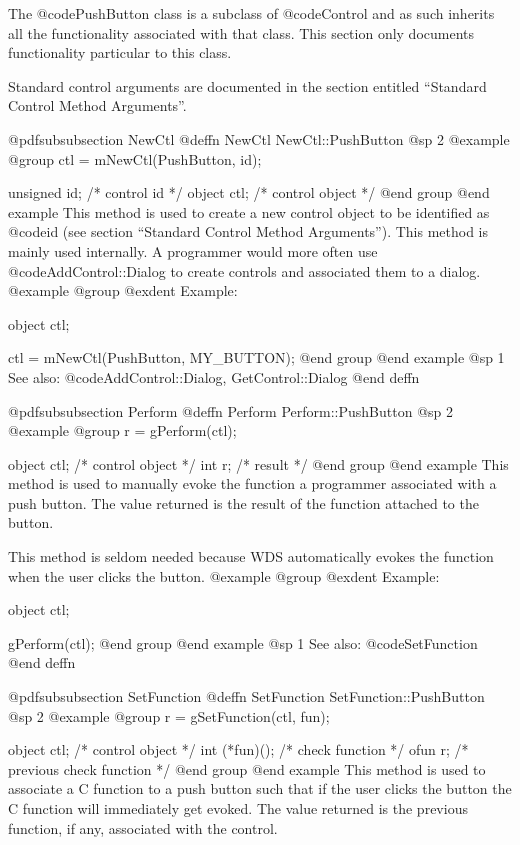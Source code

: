 The @code{PushButton} class is a subclass of @code{Control} and as such
inherits all the functionality associated with that class.  This section
only documents functionality particular to this class.

Standard control arguments are documented in the section entitled
``Standard Control Method Arguments''.





@pdfsubsubsection {NewCtl}
@deffn {NewCtl} NewCtl::PushButton
@sp 2
@example
@group
ctl = mNewCtl(PushButton, id);

unsigned  id;   /*  control id      */
object   ctl;   /*  control object  */
@end group
@end example
This method is used to create a new control object to be identified as
@code{id} (see section ``Standard Control Method Arguments'').  This
method is mainly used internally.  A programmer would more often
use @code{AddControl::Dialog} to create controls and associated them
to a dialog.
@example
@group
@exdent Example:

object  ctl;

ctl = mNewCtl(PushButton, MY_BUTTON);
@end group
@end example
@sp 1
See also:  @code{AddControl::Dialog, GetControl::Dialog}
@end deffn









@pdfsubsubsection {Perform}
@deffn {Perform} Perform::PushButton
@sp 2
@example
@group
r = gPerform(ctl);

object  ctl;      /*  control object  */
int     r;        /*  result          */
@end group
@end example
This method is used to manually evoke the function a programmer associated 
with a push button.  The value returned is the result of the function
attached to the button.

This method is seldom needed because WDS automatically evokes the function
when the user clicks the button.
@example
@group
@exdent Example:

object  ctl;

gPerform(ctl);
@end group
@end example
@sp 1
See also:  @code{SetFunction}
@end deffn






@pdfsubsubsection {SetFunction}
@deffn {SetFunction} SetFunction::PushButton
@sp 2
@example
@group
r = gSetFunction(ctl, fun);

object  ctl;      /*  control object           */
int     (*fun)(); /*  check function           */
ofun    r;        /*  previous check function  */
@end group
@end example
This method is used to associate a C function to a push button such that
if the user clicks the button the C function will immediately get
evoked.  The value returned is the previous function, if any, associated
with the control.

